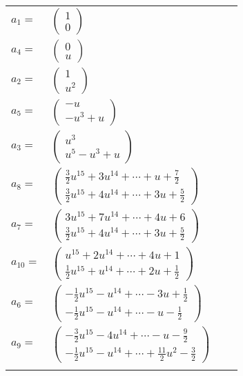 \documentclass[1p]{elsarticle_modified}
\theoremstyle{definition}
\begin{document}
\begin{tabular}{m{7pt} m{180pt} m{7pt} m{180pt} }
\flushright $a_{1}=$&$\begin{pmatrix}1\\0\end{pmatrix}$ \\
\flushright $a_{4}=$&$\begin{pmatrix}0\\u\end{pmatrix}$ \\
\flushright $a_{2}=$&$\begin{pmatrix}1\\u^2\end{pmatrix}$ \\
\flushright $a_{5}=$&$\begin{pmatrix}- u\\- u^3+u\end{pmatrix}$ \\
\flushright $a_{3}=$&$\begin{pmatrix}u^3\\u^5- u^3+u\end{pmatrix}$ \\
\flushright $a_{8}=$&$\begin{pmatrix}\frac{3}{2} u^{15}+3 u^{14}+\cdots+u+\frac{7}{2}\\\frac{3}{2} u^{15}+4 u^{14}+\cdots+3 u+\frac{5}{2}\end{pmatrix}$ \\
\flushright $a_{7}=$&$\begin{pmatrix}3 u^{15}+7 u^{14}+\cdots+4 u+6\\\frac{3}{2} u^{15}+4 u^{14}+\cdots+3 u+\frac{5}{2}\end{pmatrix}$ \\
\flushright $a_{10}=$&$\begin{pmatrix}u^{15}+2 u^{14}+\cdots+4 u+1\\\frac{1}{2} u^{15}+u^{14}+\cdots+2 u+\frac{1}{2}\end{pmatrix}$ \\
\flushright $a_{6}=$&$\begin{pmatrix}-\frac{1}{2} u^{15}- u^{14}+\cdots-3 u+\frac{1}{2}\\-\frac{1}{2} u^{15}- u^{14}+\cdots- u-\frac{1}{2}\end{pmatrix}$ \\
\flushright $a_{9}=$&$\begin{pmatrix}-\frac{3}{2} u^{15}-4 u^{14}+\cdots- u-\frac{9}{2}\\-\frac{1}{2} u^{15}- u^{14}+\cdots+\frac{11}{2} u^2-\frac{3}{2}\end{pmatrix}$\\&\end{tabular}
\end{document}

